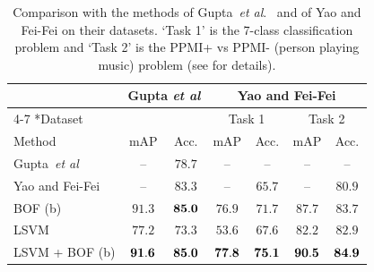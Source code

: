 \documentclass[extendedabs]{bmvc2k}
\def\etal{\emph{et al}\bmvaOneDot}
\newcommand{\cfs}{\small}   %
\begin{document}
\begin{table}[ht]
\centering
\begin{tabular}{|l||c|c||c|c||c|c|}
\hline
                        & \multicolumn{2}{c||}{Gupta \etal}  &\multicolumn{4}{c|}{Yao and Fei-Fei \cite{FeiFei10a}}     \\ \cline{4-7}
\multirow{-2}*{Dataset} & \multicolumn{2}{c||}{\cite{Gupta09}}                             &\multicolumn{2}{c||}{Task 1} &\multicolumn{2}{c|}{Task 2}  \\ \hline
Method  			                               & mAP             & Acc.           & mAP               & Acc.         & mAP               & Acc.                \\ \hline \hline
Gupta~\etal	                 & --         	   & $78.7$         & --                & --           & --                & --                  \\ \hline 
Yao and Fei-Fei                              & --	             & $83.3$         & --                & $65.7$       & --                & $80.9$              \\ \hline 
BOF (b)       		 	                         & $91.3$	         & ${\bf 85.0}$   & $76.9$            & $71.7$       & $87.7$            & $83.7$              \\ \hline 
LSVM 			  		                             & $77.2$          & $ 73.3 $       & $53.6$            & $67.6$       & $82.2$            & $82.9$              \\ \hline 
LSVM + BOF (b)	      	                     & ${\bf 91.6}$    & $ {\bf 85.0}$  & ${\bf 77.8}$      & ${\bf 75.1}$ & ${\bf 90.5}$      & ${\bf 84.9}$        \\ \hline 
\end{tabular}
\vspace{1mm}
\caption{\cfs Comparison with the methods of Gupta~\etal.~\cite{Gupta09} and of Yao and Fei-Fei \cite{FeiFei10a, FeiFei10b} on their datasets. `Task 1' is the 7-class
classification problem and `Task 2' is the PPMI+ vs PPMI- (person playing music) problem (see \cite{FeiFei10a} for details).\normalsize}
\label{tab:StateOfArt}
\end{table}
\end{document}
